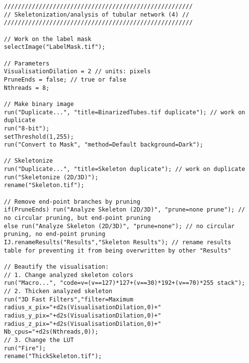 \begin{lstlisting}
//////////////////////////////////////////////////////
// Skeletonization/analysis of tubular network (4) //
//////////////////////////////////////////////////////

// Work on the label mask
selectImage("LabelMask.tif");

// Parameters
VisualisationDilation = 2 // units: pixels
PruneEnds = false; // true or false
Nthreads = 8;

// Make binary image
run("Duplicate...", "title=BinarizedTubes.tif duplicate"); // work on duplicate
run("8-bit");
setThreshold(1,255);
run("Convert to Mask", "method=Default background=Dark");

// Skeletonize
run("Duplicate...", "title=Skeleton duplicate"); // work on duplicate
run("Skeletonize (2D/3D)");
rename("Skeleton.tif");

// Remove end-point branches by pruning
if(PruneEnds) run("Analyze Skeleton (2D/3D)", "prune=none prune"); // no circular pruning, but end-point pruning
else run("Analyze Skeleton (2D/3D)", "prune=none"); // no circular pruning, no end-point pruning
IJ.renameResults("Results","Skeleton Results"); // rename results table for preventing it from being overwritten by other "Results"

// Beautify the visualisation:
// 1. Change analyzed skeleton colors
run("Macro...", "code=v=(v==127)*127+(v==30)*192+(v==70)*255 stack");
// 2. Thicken analyzed skeleton
run("3D Fast Filters","filter=Maximum radius_x_pix="+d2s(VisualisationDilation,0)+" radius_y_pix="+d2s(VisualisationDilation,0)+" radius_z_pix="+d2s(VisualisationDilation,0)+" Nb_cpus="+d2s(Nthreads,0));
// 3. Change the LUT
run("Fire");
rename("ThickSkeleton.tif"); 

\end{lstlisting}